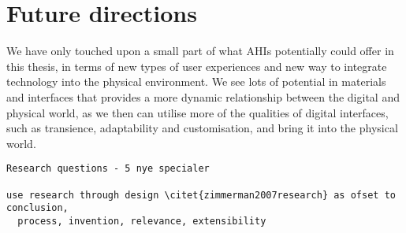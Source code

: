 \section{Future directions}
We have only touched upon a small part of what AHIs potentially could offer in this thesis, in terms of new types of user experiences and new way to integrate technology into the physical environment.
We see lots of potential in materials and interfaces that provides a more dynamic relationship between the digital and physical world, as we then can utilise more of the qualities of digital interfaces, such as transience, adaptability and customisation, and bring it into the physical world.



\begin{verbatim}
Research questions - 5 nye specialer

use research through design \citet{zimmerman2007research} as ofset to conclusion,
  process, invention, relevance, extensibility 

\end{verbatim}


